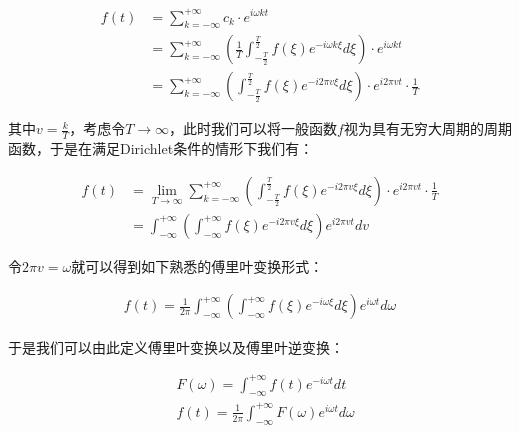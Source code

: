\documentclass[UTF8]{book}
\begin{document}
\begin{large}
    \begin{equation}
        \begin{aligned}
            f(t) &= \sum_{k=-\infty}^{+\infty}c_k \cdot e^{i\omega kt} \\
            &= \sum_{k=-\infty}^{+\infty}\left (\frac{1}{T}\int_{-\frac{T}{2}}^{\frac{T}{2}}{f(\xi )e^{-i\omega k\xi}d\xi}\right ) \cdot e^{i\omega kt} \\
            &= \sum_{k=-\infty}^{+\infty}\left (\int_{-\frac{T}{2}}^{\frac{T}{2}}{f(\xi )e^{-i2\pi v\xi}d\xi}\right ) \cdot e^{i2\pi vt} \cdot \frac{1}{T}
            \nonumber
        \end{aligned}
    \end{equation}
\end{large}
其中$v=\frac{k}{T}$，考虑令$T\to \infty$，此时我们可以将一般函数$f$视为具有无穷大周期的周期函数，于是在满足Dirichlet条件的情形下我们有：
\begin{large}
    \begin{equation}
        \begin{aligned}
            f(t) &= \lim_{T \to \infty} \sum_{k=-\infty}^{+\infty}\left (\int_{-\frac{T}{2}}^{\frac{T}{2}}{f(\xi )e^{-i2\pi v\xi}d\xi}\right ) \cdot e^{i2\pi vt} \cdot \frac{1}{T} \\
            &= \int_{-\infty}^{+\infty}\left (\int_{-\infty}^{+\infty}{f(\xi )e^{-i2\pi v\xi}d\xi}\right ) e^{i2\pi vt} dv
            \nonumber
        \end{aligned}
    \end{equation}
\end{large}
令$2\pi v=\omega$就可以得到如下熟悉的傅里叶变换形式：
\begin{large}
    \begin{equation}
        \begin{aligned}
            f(t) =\frac{1}{2\pi}\int_{-\infty}^{+\infty}\left (\int_{-\infty}^{+\infty}{f(\xi )e^{-i\omega\xi}d\xi}\right ) e^{i\omega t} d\omega
            \nonumber
        \end{aligned}
    \end{equation}
\end{large}
于是我们可以由此定义傅里叶变换以及傅里叶逆变换：
\begin{large}
    \begin{equation}
        \begin{aligned}
            &F(\omega)=\int_{-\infty}^{+\infty}f(t)e^{-i\omega t}dt \\
            &f(t)=\frac{1}{2\pi}\int_{-\infty}^{+\infty}F(\omega)e^{i\omega t}d\omega
            \nonumber
        \end{aligned}
    \end{equation}
\end{large}
\end{document}
